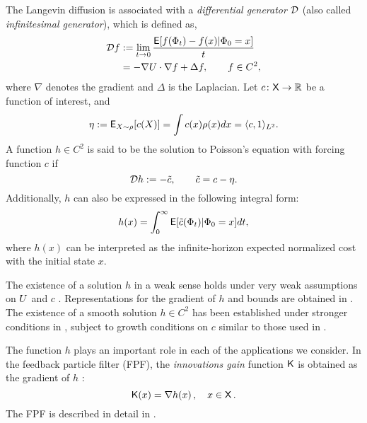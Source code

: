 
The Langevin diffusion is associated with a \textit{differential generator} ${\cal D}$ (also called \textit{infinitesimal generator}), which is defined as,
\begin{equation}
\begin{aligned}
\generate f &:= \lim_{t \to 0} \frac{\Expect [ f(\markovstate_t) - f(x) | \markovstate_0 = x]}{t} \\
& = -\nabla \pot \cdot \nabla f + \Delta f,\qquad f\in C^2,
\label{e:langevin_generator}
\end{aligned}
\end{equation}
where $\nabla$ denotes the gradient and $\Delta$ is the Laplacian. Let $c \colon {\sf X} \to \mathbb{R}$ be a function of interest, and 
\[
\eta := {\sf E}_{X \sim \rho}[c(X)] =  \int c(x) \rho(x) dx = \langle c, 1 \rangle_{L^2}.
\]
A function $h\in C^2$ is said to be the solution to Poisson's equation with forcing function $c$ if
\begin{equation}
\generate h := - \tilc, \qquad  \tilc = c - \eta.
\label{e:poissons}
\end{equation}
Additionally, $h$ can also be expressed in the following integral form:
\begin{equation}
h(x) =\int_0^\infty {\sf E}[\tilde c(\Phi_t)|\Phi_0 = x] dt,
\end{equation}
where $h(x)$ can be interpreted as the infinite-horizon expected normalized cost with the initial state $x$. 

The existence of a solution $h$ in a weak sense holds under very weak assumptions on $U$ and $c$  \cite{glymey96a,konmey12a}.   Representations for the gradient of $h$ and bounds are obtained in \cite{laumehmeyrag15,devkonmey17b}.   The existence of  a  smooth solution $h\in C^2$ has been established under stronger conditions in \cite{parver01}, subject to growth conditions on $c$ similar to those used in  \cite{glymey96a}. 

The function $h$ plays an important role in each of the applications we consider. In the feedback particle filter (FPF), the \textit{innovations gain} function $\text{\sf K}$ is obtained as  the gradient of $h$ \cite{yanmehmey13}:
\begin{equation}
\kFPF (x) = \nabla h(x)\, ,  \quad x\in\state\, .
\label{e:fpfgain}
\end{equation}
The FPF is described in detail in \Chapter{}.

